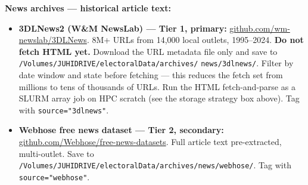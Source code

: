 \documentclass[11pt]{article}
\begin{document}
\begin{taskbox}
{  \smallskip
  \textbf{News archives --- historical article text:}
  \begin{itemize}[leftmargin=1.6em, itemsep=1pt]
    \item \textbf{3DLNews2 (W\&M NewsLab) --- Tier 1, primary:}
          \url{github.com/wm-newslab/3DLNews}.
          8M+ URLs from 14,000 local outlets, 1995--2024.
          \textbf{Do not fetch HTML yet.} Download the URL metadata file
          only and save to \texttt{/Volumes/JUHIDRIVE/electoralData/archives/}\allowbreak
          \texttt{news/3dlnews/}. Filter
          by date window and state before fetching --- this reduces the
          fetch set from millions to tens of thousands of URLs. Run the
          HTML fetch-and-parse as a SLURM array job on HPC scratch (see
          the storage strategy box above). Tag with \texttt{source="3dlnews"}.
    \item \textbf{Webhose free news dataset --- Tier 2, secondary:}
          \url{github.com/Webhose/free-news-datasets}.
          Full article text pre-extracted, multi-outlet. Save to
          \texttt{/Volumes/JUHIDRIVE/electoralData/archives/news/webhose/}.
          Tag with \texttt{source="webhose"}.
  \end{itemize}

}
\end{taskbox}
\end{document}
